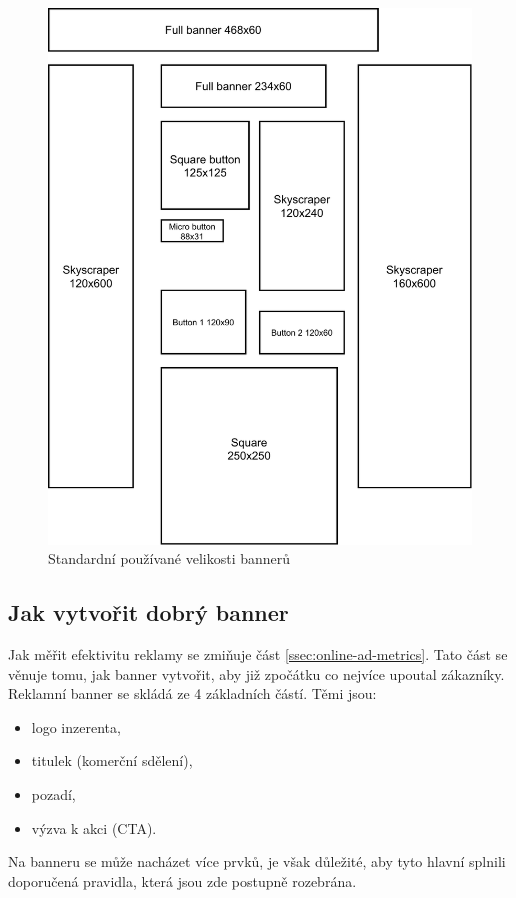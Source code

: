     \begin{figure}[h]
        \centering
        \includegraphics[width=1\textwidth]{Figures/banner-sizes.pdf}
        \caption[Velikosti bannerů]{Standardní používané velikosti bannerů}
        \label{fig:banner-sizes}
    \end{figure}

    \subsection{Jak vytvořit dobrý banner}
    Jak měřit efektivitu reklamy se zmiňuje část \ref{ssec:online-ad-metrics}. Tato část se věnuje tomu, jak banner vytvořit,
    aby již zpočátku co nejvíce upoutal zákazníky. \cite{banner:design}
    Reklamní banner se skládá ze 4 základních částí. Těmi jsou:
    \begin{itemize}
    \item logo inzerenta,
    \item titulek (komerční sdělení),
    \item pozadí,
    \item výzva k akci (CTA).
    \end{itemize}
    Na banneru se může nacházet více prvků, je však důležité, aby tyto hlavní splnili doporučená pravidla, která jsou zde postupně rozebrána.

